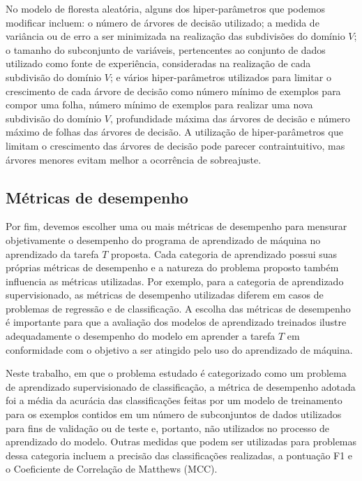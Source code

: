 No modelo de floresta aleatória, alguns dos hiper-parâmetros que podemos modificar incluem: o número de árvores de decisão utilizado; a medida de variância ou de erro a ser minimizada na realização das subdivisões do domínio $V$; o tamanho do subconjunto de variáveis, pertencentes ao conjunto de dados utilizado como fonte de experiência, consideradas na realização de cada subdivisão do domínio $V$; e vários hiper-parâmetros utilizados para limitar o crescimento de cada árvore de decisão como número mínimo de exemplos para compor uma folha, número mínimo de exemplos para realizar uma nova subdivisão do domínio $V$, profundidade máxima das árvores de decisão e número máximo de folhas das árvores de decisão. A utilização de hiper-parâmetros que limitam o crescimento das árvores de decisão pode parecer contraintuitivo, mas árvores menores evitam melhor a ocorrência de sobreajuste\cite[p.307]{statistical_learning}.

\subsection{Métricas de desempenho}

Por fim, devemos escolher uma ou mais métricas de desempenho para mensurar objetivamente o desempenho do programa de aprendizado de máquina no aprendizado da tarefa $T$ proposta. Cada categoria de aprendizado possui suas próprias métricas de desempenho e a natureza do problema proposto também influencia as métricas utilizadas. Por exemplo, para a categoria de aprendizado supervisionado, as métricas de desempenho utilizadas diferem em casos de problemas de regressão e de classificação. A escolha das métricas de desempenho é importante para que a avaliação dos modelos de aprendizado treinados ilustre adequadamente o desempenho do modelo em aprender a tarefa $T$ em conformidade com o objetivo a ser atingido pelo uso do aprendizado de máquina.

Neste trabalho, em que o problema estudado é categorizado como um problema de aprendizado supervisionado de classificação, a métrica de desempenho adotada foi a média da acurácia das classificações feitas por um modelo de treinamento para os exemplos contidos em um número de subconjuntos de dados utilizados para fins de validação ou de teste e, portanto, não utilizados no processo de aprendizado do modelo. Outras medidas que podem ser utilizadas para problemas dessa categoria incluem a precisão das classificações realizadas, a pontuação F1 e o Coeficiente de Correlação de Matthews (MCC).

